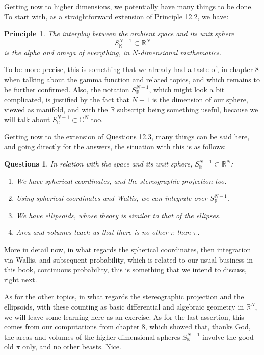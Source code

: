 \documentclass[12pt]{amsbook}
\newtheorem{principle}[theorem]{Principle}
\newtheorem{questions}[theorem]{Questions}
\begin{document}
Getting now to higher dimensions, we potentially have many things to be done. To start with, as a straightforward extension of Principle 12.2, we have:

\begin{principle}
The interplay between the ambient space and its unit sphere
$$S^{N-1}_\mathbb R\subset\mathbb R^N$$
is the alpha and omega of everything, in $N$-dimensional mathematics.
\end{principle}

To be more precise, this is something that we already had a taste of, in chapter 8 when talking about the gamma function and related topics, and which remains to be further confirmed. Also, the notation $S^{N-1}_\mathbb R$, which might look a bit complicated, is justified by the fact that $N-1$ is the dimension of our sphere, viewed as manifold, and with the $\mathbb R$ subscript being something useful, because we will talk about $S^{N-1}_\mathbb C\subset\mathbb C^N$ too.

\bigskip

Getting now to the extension of Questions 12.3, many things can be said here, and going directly for the answers, the situation with this is as follows:

\begin{questions}
In relation with the space and its unit sphere, $S^{N-1}_\mathbb R\subset\mathbb R^N$:
\begin{enumerate}
\item We have spherical coordinates, and the stereographic projection too.

\item Using spherical coordinates and Wallis, we can integrate over $S^{N-1}_\mathbb R$.

\item We have ellipsoids, whose theory is similar to that of the ellipses.

\item Area and volumes teach us that there is no other $\pi$ than $\pi$.
\end{enumerate}
\end{questions}

More in detail now, in what regards the spherical coordinates, then integration via Wallis, and subsequent probability, which is related to our usual business in this book, continuous probability, this is something that we intend to discuss, right next.

\bigskip

As for the other topics, in what regards the stereographic projection and the ellipsoids, with these counting as basic differential and algebraic geometry in $\mathbb R^N$, we will leave some learning here as an exercise. As for the last assertion, this comes from our computations from chapter 8, which showed that, thanks God, the areas and volumes of the higher dimensional spheres $S^{N-1}_\mathbb R$ involve the good old $\pi$ only, and no other beasts. Nice.
\end{document}
